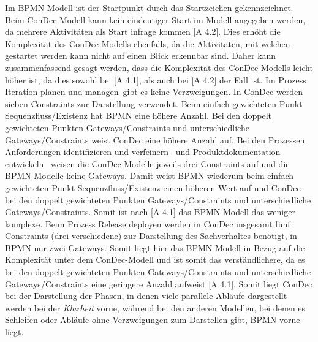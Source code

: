 Im BPMN Modell ist der Startpunkt durch das Startzeichen gekennzeichnet. Beim ConDec Modell kann kein eindeutiger Start im Modell angegeben werden, da mehrere Aktivitäten als Start infrage kommen [A 4.2]. Dies erhöht die Komplexität des ConDec Modells ebenfalls, da die Aktivitäten, mit welchen gestartet werden kann nicht auf einen Blick erkennbar sind. \newline
Daher kann zusammenfassend gesagt werden, dass die Komplexität des ConDec Modells leicht höher ist, da dies sowohl bei [A 4.1], als auch bei [A 4.2] der Fall ist.\newline
Im Prozess  \grqq Iteration planen und managen\grqq \ gibt es keine Verzweigungen. In ConDec werden sieben Constraints zur Darstellung verwendet. Beim einfach gewichteten Punkt Sequenzfluss/Existenz hat BPMN eine höhere Anzahl. Bei den doppelt gewichteten Punkten Gateways/Constraints und unterschiedliche Gateways/Constraints weist ConDec eine höhere Anzahl auf.\newline
Bei den Prozessen  \grqq Anforderungen identifizieren und verfeinern \grqq \ und  \grqq Produktdokumentation entwickeln \grqq \ weisen die ConDec-Modelle jeweils drei Constraints auf und die BPMN-Modelle keine Gateways. Damit weist BPMN wiederum beim einfach gewichteten Punkt Sequenzfluss/Existenz einen höheren Wert auf und ConDec bei den doppelt gewichteten Punkten Gateways/Constraints und unterschiedliche Gateways/Constraints. Somit ist nach [A 4.1] das BPMN-Modell das weniger komplexe.\newline
Beim Prozess Release deployen werden in ConDec insgesamt fünf Constraints (drei verschiedene) zur Darstellung des Sachverhaltes benötigt, in BPMN nur zwei Gateways. Somit liegt hier das BPMN-Modell in Bezug auf die Komplexität unter dem ConDec-Modell und ist somit das verständlichere, da es bei den doppelt gewichteten Punkten Gateways/Constraints und unterschiedliche Gateways/Constraints eine geringere Anzahl aufweist [A 4.1].\newline
Somit liegt ConDec bei der Darstellung der Phasen, in denen viele parallele Abläufe dargestellt werden bei der \textit{Klarheit} vorne, während bei den anderen Modellen, bei denen es Schleifen oder Abläufe ohne Verzweigungen zum Darstellen gibt, BPMN vorne liegt.\newline

